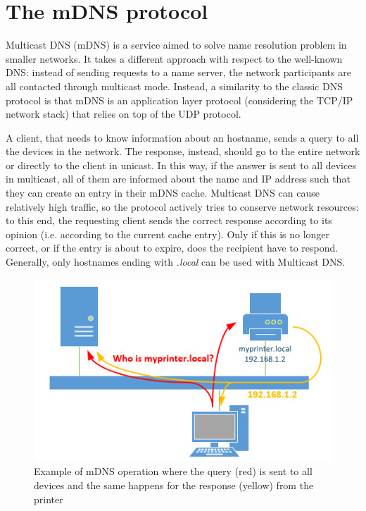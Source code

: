 \documentclass[fleqn, 11pt]{SelfArx} %
\begin{document}

\section{The mDNS protocol}
Multicast DNS (mDNS) is a service aimed to solve name resolution problem in smaller networks. It takes a different approach with respect to the well-known DNS: instead of sending requests to a name server, the network participants are all contacted through multicast mode. \newline
Instead, a similarity to the classic DNS protocol is that mDNS is an application layer protocol (considering the TCP/IP network stack) that relies on top of the UDP protocol. \newline

A client, that needs to know information about an hostname, sends a query to all the devices in the network. The response, instead, should go to the entire network or directly to the client in unicast. In this way, if the answer is sent to all devices in multicast, all of them are informed about the name and IP address such that they can create an entry in their mDNS cache. \newline
Multicast DNS can cause relatively high traffic, so the protocol actively tries to conserve network resources: to this end, the requesting client sends the correct response according to its opinion (i.e. according to the current cache entry). Only if this is no longer correct, or if the entry is about to expire, does the recipient have to respond. \newline
Generally, only hostnames ending with {\it{.local}} can be used with Multicast DNS.
\begin{figure}[H]\centering
    \includegraphics[width=\linewidth]{./mdns-02.jpg}
    \caption{Example of mDNS operation where the query (red) is sent to all devices and the same happens for the response (yellow) from the printer}
    \label{fig:msdns-1}
\end{figure}
\end{document}
